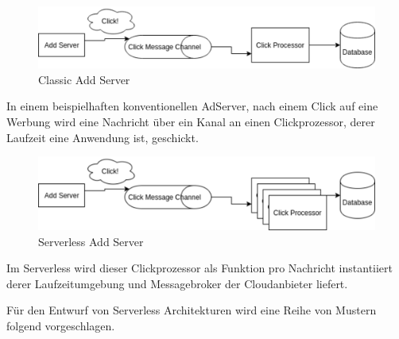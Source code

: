 \documentclass[
12pt,
english,
ngerman,
headsepline,
twoside,
openright,
numbers=noenddot,version=first
]{scrreprt}
\begin{document}
\begin{figure}
	\includegraphics[scale=0.30]{./pics/classic-example.eps}
	\caption{Classic Add Server}
	\label{pic:classic-add}
\end{figure}

In einem beispielhaften konventionellen AdServer, nach einem Click auf eine Werbung wird eine Nachricht über ein Kanal an einen Clickprozessor, derer Laufzeit eine Anwendung ist, geschickt.

\begin{figure}
	\includegraphics[scale=0.30]{./pics/serverless-example.eps}
	\caption{Serverless Add Server}
	\label{pic:serverless-add}
\end{figure}

Im Serverless wird dieser Clickprozessor als Funktion pro Nachricht instantiiert derer Laufzeitumgebung und Messagebroker der Cloudanbieter liefert. \cite{fowlerBlogServerless}
 

Für den Entwurf von Serverless Architekturen wird eine Reihe von Mustern folgend vorgeschlagen.
\end{document}
